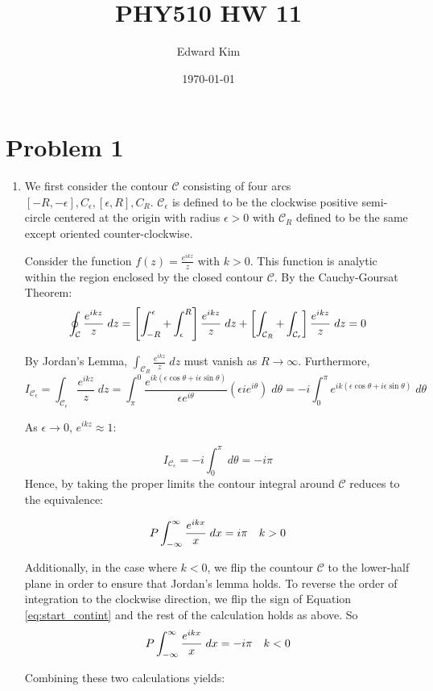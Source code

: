 \documentclass[12pt]{article}%
\title{PHY510 HW 11}
\author{Edward Kim}
\date{\today}
\newcommand{\C}{\mathcal{C}}
\newcommand{\contint}[1][\mathcal{C}]{\oint_{#1}}
\newcommand{\Cep}{\mathcal{C}_\epsilon}
\newcommand{\CR}{\mathcal{C}_R}
\begin{document}
\maketitle
\section{Problem 1}
\begin{enumerate}
  \item We first consider the contour $\C$ consisting of four arcs $[-R,-\epsilon], C_\epsilon, [\epsilon,R], C_R$. $\Cep$ is defined to be the clockwise positive semi-circle centered at the origin with radius $\epsilon > 0$ with $\CR$ defined to be the same except oriented counter-clockwise.

  Consider the function $f(z)= \frac{e^{ikz}}{z}$ with $k > 0$. This function is analytic within the region enclosed by the closed contour $\C$. By the Cauchy-Goursat Theorem:
  \begin{equation} \label{eq:start_contint}
\contint \frac{e^{ikz}}{z} \; dz = \left[ \int_{-R}^{\-\epsilon} + \int_\epsilon^R  \right]\frac{e^{ikz}}{z} \; dz +   \left[\int_{\CR} + \int_{\Cep} \right] \frac{e^{ikz}}{z} \; dz = 0
  \end{equation}

  By Jordan's Lemma, $\int_{\CR}\frac{e^{ikz}}{z} \; dz$ must vanish as $R \rightarrow \infty$. Furthermore,
  \[I_{\Cep} = \int_{\Cep}\frac{e^{ikz}}{z} \; dz = \int_{\pi}^0 \frac{e^{ik(\epsilon\cos{\theta}+ i\epsilon\sin{\theta})}}{\epsilon e^{i\theta}} (\epsilon ie^{i\theta}) \; d\theta =   -i\int_0^\pi e^{ik(\epsilon\cos{\theta}+ i\epsilon\sin{\theta})} \; d\theta \]

  As $\epsilon \rightarrow 0$, $e^{ikz} \approx 1$:

\[I_{\Cep} = -i\int_0^\pi\; d\theta = -i\pi\]
Hence, by taking the proper limits the contour integral around $\C$ reduces to the equivalence:

\[ P \int_{-\infty}^{\infty} \frac{e^{ikx}}{x} \; dx = i\pi  \quad k > 0 \]

Additionally, in the case where $k < 0$, we flip the countour $
\C$ to the lower-half plane in order to ensure that Jordan's lemma holds. To reverse the order of integration to the clockwise direction, we flip the sign of Equation \ref{eq:start_contint} and the rest of the calculation holds as above. So
\[P \int_{-\infty}^{\infty} \frac{e^{ikx}}{x} \; dx = -i\pi \quad k < 0\]

Combining these two calculations yields:


\end{enumerate}
\end{document}
